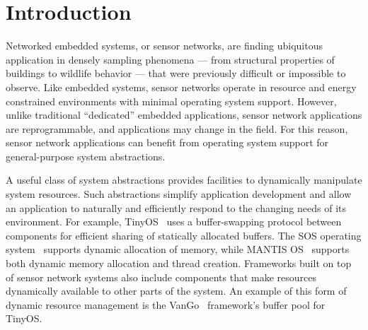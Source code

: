 \section{Introduction}
\label{sec:intro}

% 
% 
% 
% 


Networked embedded systems, or sensor networks, are finding ubiquitous
application in densely sampling phenomena --- from structural properties of
buildings to wildlife behavior --- that were previously difficult or
impossible to observe.  
%
Like embedded systems, sensor networks operate in resource and energy
constrained environments with minimal operating system support.  
%
However, unlike traditional ``dedicated'' embedded applications, sensor
network applications are reprogrammable, and applications may change in the
field.  
%
For this reason, sensor network applications can benefit from operating
system support for general-purpose system abstractions.



A useful class of system abstractions provides facilities to dynamically
manipulate system resources.  
%
Such abstractions simplify application development and allow an application
to naturally and efficiently respond to the changing needs of its
environment.  
%
For example, TinyOS~\cite{TinyOS} uses a buffer-swapping protocol between
components for efficient sharing of statically allocated buffers.  
%
The SOS operating system~\cite{sos} supports dynamic allocation of memory,
while MANTIS OS~\cite{abrach03mantis} supports both dynamic memory
allocation and thread creation.  
%
Frameworks built on top of sensor network systems also include components
that make resources dynamically available to other parts of the system.  
%
An example of this form of dynamic resource management is the
VanGo~\cite{greenstein05vango} framework's buffer pool for TinyOS. 



